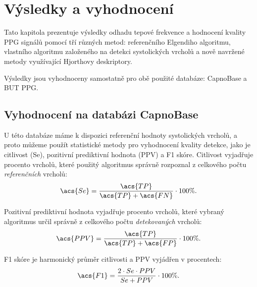 \chapter{Výsledky a vyhodnocení}
\label{ch:vysledky}
Tato kapitola prezentuje výsledky odhadu tepové frekvence a hodnocení kvality PPG signálů pomocí tří různých metod:
referenčního Elgendiho algoritmu, vlastního algoritmu založeného na detekci systolických vrcholů a nově navržené metody využívající Hjorthovy deskriptory.

Výsledky jsou vyhodnoceny samostatně pro obě použité databáze: CapnoBase a \acl{BUT PPG}.

\section{Vyhodnocení na databázi CapnoBase}
\label{sec:vysledky_capnobase}
U této databáze máme k dispozici referenční hodnoty systolických vrcholů, a proto můžeme použít statistické metody pro vyhodnocení kvality detekce, jako je citlivost (\acs{Se}), pozitivní prediktivní hodnota (\acs{PPV}) a F1 skóre.
Citlivost vyjadřuje procento vrcholů, které použitý algoritmus správně rozpoznal z celkového počtu \textit{referenčních} vrcholů:
\begin{equation}
	\label{eq:se}
	\acs{Se} = \frac{\acs{TP}}{\acs{TP} + \acs{FN}} \cdot 100\%.
\end{equation}

Pozitivní prediktivní hodnota vyjadřuje procento vrcholů, které vybraný algoritmus určil správně z celkového počtu \textit{detekovaných} vrcholů:
\begin{equation}
	\label{eq:ppv}
	\acs{PPV} = \frac{\acs{TP}}{\acs{TP} + \acs{FP}} \cdot 100\%.
\end{equation}

\acs{F1} skóre je harmonický průměr citlivosti a \acs{PPV} vyjádřen v procentech:
\begin{equation}
	\label{eq:f1}
	\acs{F1} = \frac{2 \cdot Se \cdot PPV}{Se + PPV} \cdot 100\%.
\end{equation}

